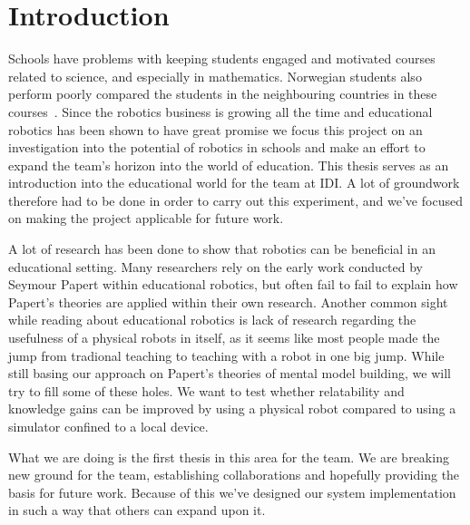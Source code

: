 \chapter{Introduction}
Schools have problems with keeping students engaged and motivated courses related to science, and especially in mathematics. 
Norwegian students also perform poorly compared the students in the neighbouring countries in these courses~\cite{OECDPISA}.
Since the robotics business is growing all the time and educational robotics has been shown to have great promise we focus this project on an investigation into the potential of robotics in schools and make an effort to expand the \chirp team's horizon into the world of education. This thesis serves as an introduction into the educational world for the \chirp team at IDI. A lot of groundwork therefore had to be done in order to carry out this experiment, and we've focused on making the project applicable for future work.

\bigskip\noindent
A lot of research has been done to show that robotics can be beneficial in an educational setting.
Many researchers rely on the early work conducted by Seymour Papert within educational robotics, but often fail to fail to explain how Papert's theories are applied within their own research. 
Another common sight while reading about educational robotics is lack of research regarding the usefulness of a physical robots in itself, as it seems like most people made the jump from tradional teaching to teaching with a robot in one big jump. 
While still basing our approach on Papert's theories of mental model building, we will try to fill some of these holes. We want to test whether relatability and knowledge gains can be improved by using a physical robot compared to using a simulator confined to a local device. 

\bigskip\noindent
What we are doing is the first thesis in this area for the \chirp team. We are breaking new ground for the team, establishing collaborations and hopefully providing the basis for future work. 
Because of this we've designed our system implementation in such a way that others can expand upon it. 


